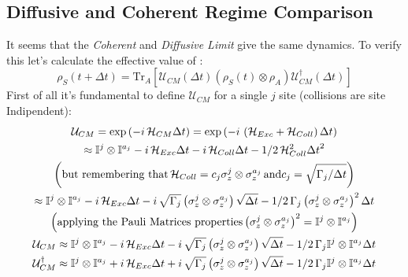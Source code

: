 \documentclass[a4paper,12pt]{article}
\begin{document}
	\subsection{Diffusive and Coherent Regime Comparison}
	\label{sub:Diffusive_and_Coherent_Regime_Comparison}
	It seems that the \textit{Coherent} and \textit{Diffusive Limit} give the same dynamics. To verify this let's calculate the effective value of :
	\begin{equation}
		\rho_{S}(t + \Delta t) = \text{Tr}_A \left[ \mathcal{U}_{CM}(\Delta t) \left(\rho_{S}(t) \otimes \rho_{A}\right) \mathcal{U}_{CM}^{\dagger}(\Delta t) \right]
		\label{eq:dynamical_map_rho_s}
	\end{equation}
	First of all it's fundamental to define $ \mathcal{U}_{CM} $ for a single $ j $ site (collisions are site Indipendent):
	\begin{gather}
		\mathcal{U}_{CM} = \exp{\left(-i \, \mathcal{H}_{CM} \Delta t \right)} = \exp{\left(-i \, \left(\mathcal{H}_{Exc} + \mathcal{H}_{Coll}\right) \Delta t \right)} \notag \\
		\approx \mathbb{I}^{j} \otimes \mathbb{I}^{a_j} -i \, \mathcal{H}_{Exc} \Delta t -i \, \mathcal{H}_{Coll} \Delta t - 1/2 \, \mathcal{H}_{Coll}^{2} {\Delta t}^{2} \notag \\
		\left(\text{but remembering that} \, \mathcal{H}_{Coll} = c_j \sigma_{z}^{j} \otimes \sigma_{z}^{a_j} \, \text{and} c_j = \sqrt{\Gamma_{j}/\Delta t}\right) \notag \\
		\approx \mathbb{I}^{j} \otimes \mathbb{I}^{a_j} -i \, \mathcal{H}_{Exc} \Delta t -i \,\sqrt{\Gamma_{j}} \left(\sigma_{z}^{j} \otimes \sigma_{z}^{a_j} \right) \sqrt{\Delta t} - 1/2 \, \Gamma_{j} \left(\sigma_{z}^{j} \otimes \sigma_{z}^{a_j} \right)^{2} \Delta t \notag \\
		\left( \text{applying the Pauli Matrices properties} \left(\sigma_{z}^{j} \otimes \sigma_{z}^{a_j} \right)^{2} = \mathbb{I}^{j} \otimes \mathbb{I}^{a_j} \right) \notag \\
		\mathcal{U}_{CM} \approx \mathbb{I}^{j} \otimes \mathbb{I}^{a_j} -i \, \mathcal{H}_{Exc} \Delta t -i \,\sqrt{\Gamma_{j}} \left(\sigma_{z}^{j} \otimes \sigma_{z}^{a_j} \right) \sqrt{\Delta t} - 1/2 \, \Gamma_{j}\mathbb{I}^{j} \otimes \mathbb{I}^{a_j} \Delta t \label{eq:U_CM_expansion_series} \\
		\mathcal{U}_{CM}^{\dagger} \approx \mathbb{I}^{j} \otimes \mathbb{I}^{a_j} +i \, \mathcal{H}_{Exc} \Delta t +i \,\sqrt{\Gamma_{j}} \left(\sigma_{z}^{j} \otimes \sigma_{z}^{a_j} \right) \sqrt{\Delta t} - 1/2 \, \Gamma_{j} \mathbb{I}^{j} \otimes \mathbb{I}^{a_j} \Delta t \label{eq:U_CM_dagger_expansion_series}
	\end{gather}
\end{document}
